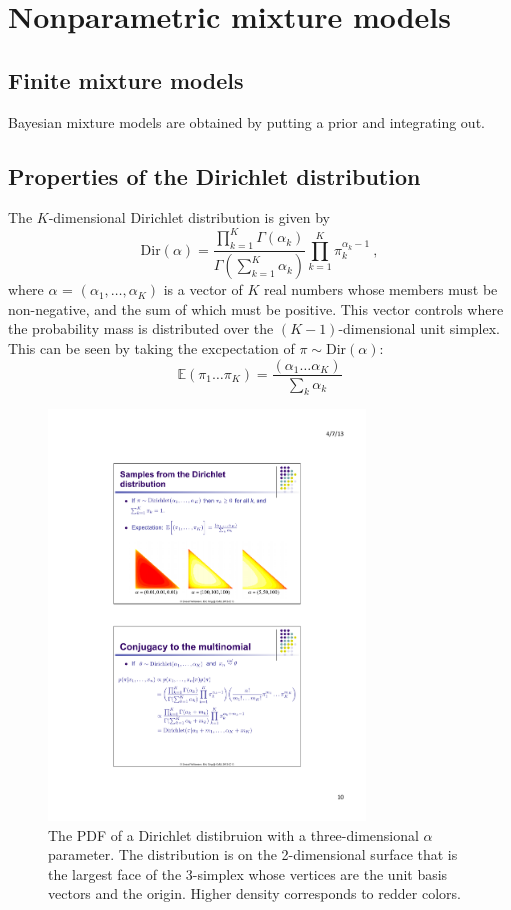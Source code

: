\documentclass[twoside]{article}
\newcommand{\Dir}{\mathrm{Dir}}
\begin{document}
\section{Nonparametric mixture models}
\subsection{Finite mixture models}
Bayesian mixture models are obtained by putting a prior and integrating out.

\subsection{Properties of the Dirichlet distribution}
The $K$-dimensional Dirichlet distribution is given by
\[
\Dir(\alpha) = \frac{\prod_{k=1}^{K} \Gamma{(\alpha_k)}}{\Gamma{(\sum_{k=1}^{K} \alpha_k)}} \prod_{k=1}^{K} \pi_{k}^{\alpha_k - 1} \:,
\]
where $\alpha$ = $(\alpha_1, \dots, \alpha_K)$ is a vector of $K$ real numbers whose members must be non-negative, and the sum of which must be positive.  This vector controls where the probability mass is distributed over the $(K-1)$-dimensional unit simplex.  This can be seen by taking the excpectation of $\pi \sim \Dir(\alpha)$:
$$ \mathbb{E}(\pi_1 \dots \pi_K) = \frac{(\alpha_1 \dots \alpha_K)}{\sum_k \alpha_k} $$ 

\begin{figure}[htbp] %
   \centering
   \includegraphics[width=0.75\textwidth]{dirichlet.pdf} 
   \caption{The PDF of a Dirichlet distibruion with a three-dimensional $\alpha$ parameter.  The distribution is on the 2-dimensional surface that is the largest face of the 3-simplex whose vertices are the unit basis vectors and the origin.  Higher density corresponds to redder colors.}
   \label{fig:diricheltpdfs}
\end{figure}
\end{document}
